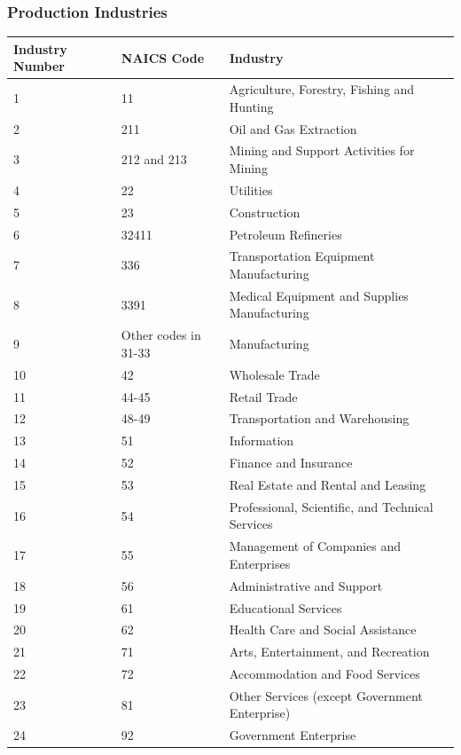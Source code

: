 \documentclass{beamer}
\begin{document}
    \begin{frame}
    \frametitle{Production Industries}
\begin{table}[htbp]
  \centering
  \tiny
    \begin{tabular}{lll}
    \hline
    \hline
    Industry Number & NAICS Code & Industry \\
    \hline
    1     & 11    & Agriculture, Forestry, Fishing and Hunting \\
    2     & 211   & Oil and Gas Extraction \\
    3     & 212 and 213 & Mining and Support Activities for Mining \\
    4     & 22    & Utilities \\
    5     & 23    & Construction \\
    6     & 32411 & Petroleum Refineries \\
    7     & 336   & Transportation Equipment Manufacturing \\
    8     & 3391  & Medical Equipment and Supplies Manufacturing \\
    9     & Other codes in 31-33 & Manufacturing \\
    10    & 42    & Wholesale Trade \\
    11    & 44-45 & Retail Trade \\
    12    & 48-49 & Transportation and Warehousing \\
    13    & 51    & Information \\
    14    & 52    & Finance and Insurance \\
    15    & 53    & Real Estate and Rental and Leasing \\
    16    & 54    & Professional, Scientific, and Technical Services \\
    17    & 55    & Management of Companies and Enterprises \\
    18    & 56    & Administrative and Support \\
    19    & 61    & Educational Services \\
    20    & 62    & Health Care and Social Assistance \\
    21    & 71    & Arts, Entertainment, and Recreation \\
    22    & 72    & Accommodation and Food Services \\
    23    & 81    & Other Services (except Government Enterprise) \\
    24    & 92    & Government Enterprise \\
    \hline
    \hline
    \end{tabular}%
  \label{tab:addlabel}%
\end{table}%
\end{frame}
\end{document}
